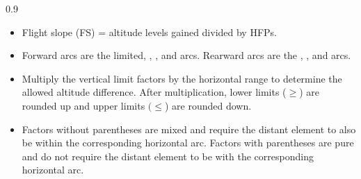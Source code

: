 \begin{twocolumntablefloat}
\begin{twocolumntable}
\smallskip

\begin{tablenote}{0.9\linewidth}\footnotesize
\begin{itemize}

\item
Flight slope (FS) = altitude levels gained divided by HFPs.

\item Forward arcs are the limited, , , and  arcs. Rearward arcs are the ,  , and   arcs. 

\item
Multiply the vertical limit factors by the horizontal range to determine the allowed altitude difference. After multiplication, lower limits ($\ge$) are rounded up and upper limits $(\le$) are rounded down. 

\item
Factors without parentheses are mixed and require the distant element to also be within the corresponding horizontal arc. Factors with parentheses are pure and do not require the distant element to be with the corresponding horizontal arc. 

\end{itemize}
\end{tablenote}


\end{twocolumntable}
\end{twocolumntablefloat}
